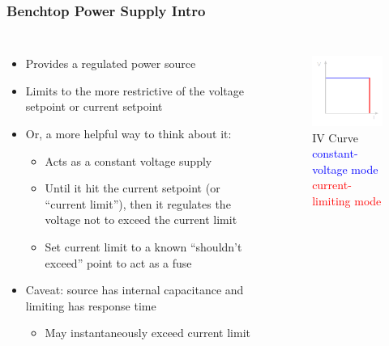 \documentclass{beamer}
\begin{document}
\begin{frame}
\frametitle{Benchtop Power Supply Intro}
\begin{columns}[t]
\begin{itemize}
  \item Provides a regulated power source
  \item Limits to the more restrictive of the voltage setpoint or current setpoint
  \item Or, a more helpful way to think about it:
  \begin{itemize}
    \item Acts as a constant voltage supply
    \item Until it hit the current setpoint (or ``current limit''), then it regulates the voltage not to exceed the current limit
    \item Set current limit to a known ``shouldn't exceed'' point to act as a fuse
  \end{itemize}
  \item Caveat: source has internal capacitance and limiting has response time
  \begin{itemize}
    \item May instantaneously exceed current limit
  \end{itemize}
\end{itemize}

\begin{figure}
  \centering
  \includegraphics[width=1.0\columnwidth]{images-dis2/psu-iv} \newline
  IV Curve \\
  {\tiny \textcolor{blue}{constant-voltage mode}} \\
  {\tiny \textcolor{red}{current-limiting mode}}
\end{figure}
\end{columns}
\end{frame}
\end{document}
